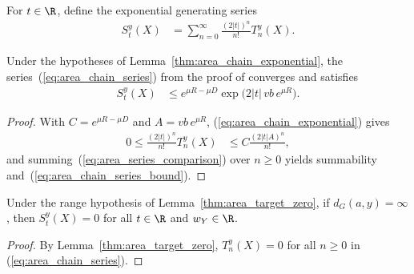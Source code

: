 \begin{definition}
    \label{def:area_chain_series}
    \leanok
    For $t\in\R$, define the exponential generating series
    \begin{align}
        S_t^y(X) & =\sum_{n=0}^{\infty}\frac{(2|t|)^n}{n!}T_n^y(X).
        \label{eq:area_chain_series}
    \end{align}
\end{definition}

\begin{theorem}
    \label{thm:area_chain_series_bound}
    \leanok
    Under the hypotheses of Lemma~\ref{thm:area_chain_exponential}, the
    series~(\ref{eq:area_chain_series}) from the proof of
    \cite[Lemma~4.1]{OpenAI2026AreaLaw} converges and satisfies
    \begin{align}
        S_t^y(X) & \le e^{\mu R-\mu D}
        \exp\!\bigl(2|t|\,vb\,e^{\mu R}\bigr).
        \label{eq:area_chain_series_bound}
    \end{align}
\end{theorem}
\begin{proof}
    \leanok
    With $C=e^{\mu R-\mu D}$ and $A=vb\,e^{\mu R}$,
    (\ref{eq:area_chain_exponential}) gives
    \begin{align}
        0\le\frac{(2|t|)^n}{n!}T_n^y(X)
         & \le C\frac{(2|t|A)^n}{n!},
        \label{eq:area_series_comparison}
    \end{align}
    and summing~(\ref{eq:area_series_comparison}) over $n\ge0$ yields
    summability and~(\ref{eq:area_chain_series_bound}).
\end{proof}

\begin{lemma}
    \label{thm:area_chain_series_zero}
    \leanok
    Under the range hypothesis of Lemma~\ref{thm:area_target_zero}, if
    $d_G(a,y)=\infty$, then $S_t^y(X)=0$ for all $t\in\R$ and $w_Y\in\R$.
\end{lemma}
\begin{proof}
    \leanok
    By Lemma~\ref{thm:area_target_zero}, $T_n^y(X)=0$ for all $n\ge0$ in
    (\ref{eq:area_chain_series}).
\end{proof}
